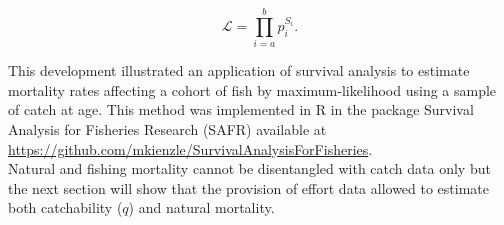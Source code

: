 \begin{equation}
\mathcal{L} = \prod_{i=a}^{b} p_{i} ^ {S_{i}}.
\end{equation}

This development illustrated an application of survival analysis to estimate mortality rates affecting a cohort of fish by maximum-likelihood using a sample of catch at age. This method was implemented in R \citep{R} in the package Survival Analysis for Fisheries Research (SAFR) available at \url{https://github.com/mkienzle/SurvivalAnalysisForFisheries}. \\ %

Natural and fishing mortality cannot be disentangled with catch data only but the next section will show that the provision of effort data allowed to estimate both catchability ($q$) and natural mortality. 
